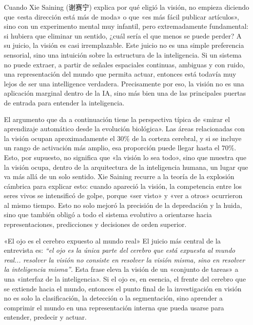 \documentclass[a4paper,12pt]{article}
\begin{document}
Cuando Xie Saining (谢赛宁) explica por qué eligió la visión, no empieza diciendo que «esta dirección está más de moda» o que «es más fácil publicar artículos», sino con un experimento mental muy infantil, pero extremadamente fundamental: si hubiera que eliminar un sentido, ¿cuál sería el que menos se puede perder? A su juicio, la visión es casi irremplazable. Este juicio no es una simple preferencia sensorial, sino una intuición sobre la estructura de la inteligencia. Si un sistema no puede extraer, a partir de señales espaciales continuas, ambiguas y con ruido, una representación del mundo que permita actuar, entonces está todavía muy lejos de ser una intelligence verdadera. Precisamente por eso, la visión no es una aplicación marginal dentro de la IA, sino más bien una de las principales puertas de entrada para entender la inteligencia.

El argumento que da a continuación tiene la perspectiva típica de «mirar el aprendizaje automático desde la evolución biológica». Las áreas relacionadas con la visión ocupan aproximadamente el \(30\%\) de la corteza cerebral, y si se incluye un rango de activación más amplio, esa proporción puede llegar hasta el \(70\%\). Esto, por supuesto, no significa que «la visión lo sea todo», sino que muestra que la visión ocupa, dentro de la arquitectura de la inteligencia humana, un lugar que va más allá de un solo sentido. Xie Saining recurre a la teoría de la explosión cámbrica para explicar esto: cuando apareció la visión, la competencia entre los seres vivos se intensificó de golpe, porque «ser visto» y «ver a otros» ocurrieron al mismo tiempo. Esto no solo mejoró la precisión de la depredación y la huida, sino que también obligó a todo el sistema evolutivo a orientarse hacia representaciones, predicciones y decisiones de orden superior.

\begin{importantbox}{«El ojo es el cerebro expuesto al mundo real»}
El juicio más central de la entrevista es: \textit{``el ojo es la única parte del cerebro que está expuesta al mundo real... resolver la visión no consiste en resolver la visión misma, sino en resolver la inteligencia misma''}. Esta frase eleva la visión de un «conjunto de tareas» a una «interfaz de la inteligencia». Si el ojo es, en esencia, el frente del cerebro que se extiende hacia el mundo, entonces el punto final de la investigación en visión no es solo la clasificación, la detección o la segmentación, sino aprender a comprimir el mundo en una representación interna que pueda usarse para entender, predecir y actuar.
\end{importantbox}
\end{document}
